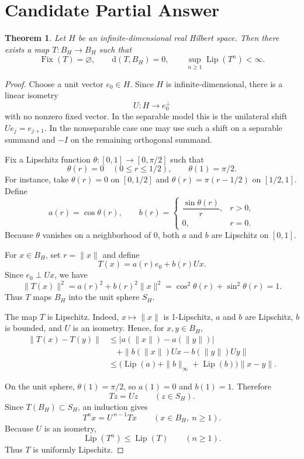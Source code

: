 \documentclass[11pt]{article}
\newtheorem{theorem}{Theorem}
\newcommand{\Fix}{\operatorname{Fix}}
\newcommand{\Lip}{\operatorname{Lip}}
\begin{document}
\section*{Candidate Partial Answer}

\begin{theorem}
Let \(H\) be an infinite-dimensional real Hilbert space.  Then there exists
a map \(T:B_H\to B_H\) such that
\[
\Fix(T)=\varnothing,\qquad
\mathrm d(T,B_H)=0,\qquad
\sup_{n\ge 1}\Lip(T^n)<\infty .
\]
\end{theorem}

\begin{proof}
Choose a unit vector \(e_0\in H\).  Since \(H\) is infinite-dimensional,
there is a linear isometry
\[
U:H\to e_0^\perp
\]
with no nonzero fixed vector.  In the separable model this is the unilateral
shift \(Ue_j=e_{j+1}\).  In the nonseparable case one may use such a shift on
a separable summand and \(-I\) on the remaining orthogonal summand.

Fix a Lipschitz function \(\theta:[0,1]\to[0,\pi/2]\) such that
\[
\theta(r)=0\quad(0\le r\le 1/2),\qquad
\theta(1)=\pi/2 .
\]
For instance, take \(\theta(r)=0\) on \([0,1/2]\) and
\(\theta(r)=\pi(r-1/2)\) on \([1/2,1]\).  Define
\[
a(r)=\cos\theta(r),\qquad
b(r)=
\begin{cases}
\dfrac{\sin\theta(r)}{r},& r>0,\\[2mm]
0,& r=0.
\end{cases}
\]
Because \(\theta\) vanishes on a neighborhood of \(0\), both \(a\) and \(b\)
are Lipschitz on \([0,1]\).

For \(x\in B_H\), set \(r=\|x\|\) and define
\[
T(x)=a(r)e_0+b(r)Ux .
\]
Since \(e_0\perp Ux\), we have
\[
\|T(x)\|^2=a(r)^2+b(r)^2\|x\|^2
=\cos^2\theta(r)+\sin^2\theta(r)=1 .
\]
Thus \(T\) maps \(B_H\) into the unit sphere \(S_H\).

The map \(T\) is Lipschitz.  Indeed, \(x\mapsto \|x\|\) is
1-Lipschitz, \(a\) and \(b\) are Lipschitz, \(b\) is bounded, and \(U\) is an
isometry.  Hence, for \(x,y\in B_H\),
\[
\begin{aligned}
\|T(x)-T(y)\|
&\le |a(\|x\|)-a(\|y\|)|\\
&\quad+\|b(\|x\|)Ux-b(\|y\|)Uy\|\\
&\le \bigl(\Lip(a)+\|b\|_\infty+\Lip(b)\bigr)\|x-y\|.
\end{aligned}
\]

On the unit sphere, \(\theta(1)=\pi/2\), so \(a(1)=0\) and \(b(1)=1\).
Therefore
\[
Tz=Uz\qquad(z\in S_H).
\]
Since \(T(B_H)\subset S_H\), an induction gives
\[
T^n x=U^{\,n-1}T x\qquad(x\in B_H,\ n\ge 1).
\]
Because \(U\) is an isometry,
\[
\Lip(T^n)\le \Lip(T)\qquad(n\ge 1).
\]
Thus \(T\) is uniformly Lipschitz.


\end{proof}
\end{document}
